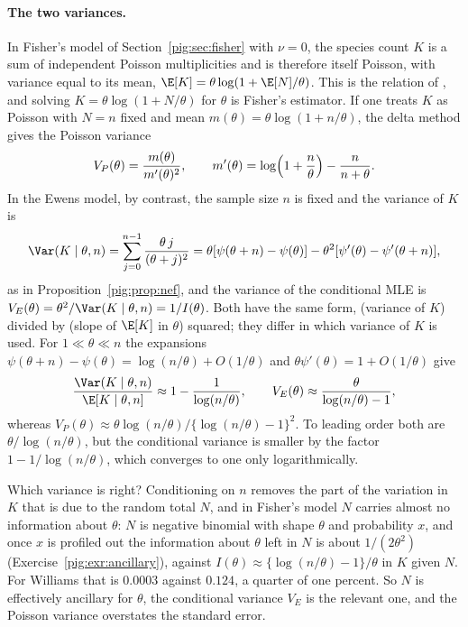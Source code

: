 \paragraph{The two variances.} In Fisher's model of Section~\ref{pig:sec:fisher} with $\nu=0$, the species count $K$ is a sum of independent Poisson multiplicities and is therefore itself Poisson, with variance equal to its mean, $\E[K]=\theta\log(1+\E[N]/\theta)$. This is the relation of \citet{pig:fisher1943}, and solving $K=\theta\log(1+N/\theta)$ for $\theta$ is Fisher's estimator. If one treats $K$ as Poisson with $N=n$ fixed and mean $m(\theta)=\theta\log(1+n/\theta)$, the delta method gives the Poisson variance
\begin{equation}\label{pig:eq:poisvar}
V_P(\theta)=\frac{m(\theta)}{m'(\theta)^2},\qquad m'(\theta)=\log\Bigl(1+\frac n\theta\Bigr)-\frac{n}{n+\theta}.
\end{equation}
In the Ewens model, by contrast, the sample size $n$ is fixed and the variance of $K$ is
\begin{equation}\label{pig:eq:esfvar}
\Var(K\mid\theta,n)=\sum_{j=0}^{n-1}\frac{\theta\,j}{(\theta+j)^2}=\theta[\psi(\theta+n)-\psi(\theta)]-\theta^2[\psi'(\theta)-\psi'(\theta+n)],
\end{equation}
as in Proposition~\ref{pig:prop:nef}, and the variance of the conditional MLE is $V_E(\theta)=\theta^2/\Var(K\mid\theta,n)=1/I(\theta)$. Both have the same form, (variance of $K$) divided by (slope of $\E[K]$ in $\theta$) squared; they differ in which variance of $K$ is used. For $1\ll\theta\ll n$ the expansions $\psi(\theta+n)-\psi(\theta)=\log(n/\theta)+O(1/\theta)$ and $\theta\psi'(\theta)=1+O(1/\theta)$ give
\[
\frac{\Var(K\mid\theta,n)}{\E[K\mid\theta,n]}\approx1-\frac{1}{\log(n/\theta)},\qquad V_E(\theta)\approx\frac{\theta}{\log(n/\theta)-1},
\]
whereas $V_P(\theta)\approx\theta\log(n/\theta)/\{\log(n/\theta)-1\}^2$. To leading order both are $\theta/\log(n/\theta)$, but the conditional variance is smaller by the factor $1-1/\log(n/\theta)$, which converges to one only logarithmically.

Which variance is right? Conditioning on $n$ removes the part of the variation in $K$ that is due to the random total $N$, and in Fisher's model $N$ carries almost no information about $\theta$: $N$ is negative binomial with shape $\theta$ and probability $x$, and once $x$ is profiled out the information about $\theta$ left in $N$ is about $1/(2\theta^2)$ (Exercise~\ref{pig:exr:ancillary}), against $I(\theta)\approx\{\log(n/\theta)-1\}/\theta$ in $K$ given $N$. For Williams that is $0.0003$ against $0.124$, a quarter of one percent. So $N$ is effectively ancillary for $\theta$, the conditional variance $V_E$ is the relevant one, and the Poisson variance overstates the standard error.

